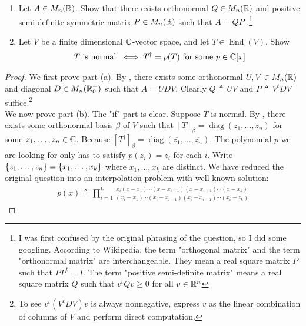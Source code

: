 \documentclass{report}
\begin{document}
\begin{question}{}{}
\begin{enumerate}[label=(\alph*)]
  \item Let $A\in M_n(\mathbb{R})$. Show that there exists orthonormal $Q\in M_n(\mathbb{R})$ and positive semi-definite symmetric matrix $P \in M_n(\mathbb{R})$ such that $A=QP$ .\footnote{I was first confused by the original phrasing of the question, so I did some googling. According to Wikipedia, the term "orthogonal matrix" and the term "orthonormal matrix" are interchangeable. They mean a real square matrix  $P$ such that  $PP^t=I$. The term "positive semi-definite matrix" means a real square matrix $Q$ such that $v^tQv\geq 0$ for all $v \in\mathbb{R}^n$} 
  \item Let $V$ be a finite dimensional  $\mathbb{C}$-vector space, and let $T \in \operatorname{End}(V)$. Show 
\begin{align*}
T\text{ is normal }\iff  T^{\dagger }=p(T)\text{ for some }p \in \mathbb{C}[x]
\end{align*}
  \end{enumerate}  
\end{question}
\begin{proof}
  We first prove part (a). By , there exists some orthonormal $U,V \in M_n(\mathbb{R})$ and diagonal  $D \in M_n(\mathbb{R}^+_0)$ such that $A=UDV$. Clearly $Q\triangleq UV$ and $P\triangleq V^tD V$ suffice.\footnote{To see $v^t(V^tDV)v$ is always nonnegative, express $v$ as the linear combination of columns of  $V$ and perform  direct computation.} \\

We now prove part (b). The "if" part is clear. Suppose $T$ is normal. By , there exists some orthonormal basis $\beta $ of $V$ such that  $[T]_\beta  = \operatorname{diag}(z_1,\dots ,z_n)$ for some $z_1,\dots ,z_n \in\mathbb{C}$. Because $[T^{\dagger }]_\beta  = \operatorname{diag}(\overline{z_1},\dots, \overline{z_n})$. The polynomial $p$ we are looking for only has to satisfy $p(z_i)= \overline{z_i}$ for each $i$. Write $\{ z_1,\dots , z_n \}=\{ x_1,\dots ,x_k \}$ where $x_1,\dots ,x_k$ are distinct. We have reduced the original question into an interpolation problem with well known solution: 
\begin{align*}
p(x)\triangleq \prod_{i=1}^k \frac{\overline{x_i}(x-x_1)\cdots (x-x_{i-1})(x-x_{i+1})\cdots (x-x_{k})}{(x_i-x_1)\cdots (x_i- x_{i-1})(x_i-x_{i+1})\cdots (x_i-z_k)}
\end{align*}
\end{proof}
\end{document}
